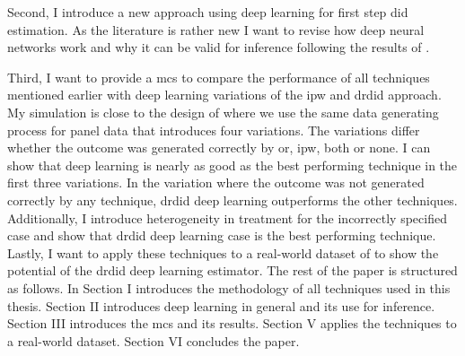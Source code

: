 Second, I introduce a new approach using deep learning for first step \ac{did} estimation.
As the literature is rather new I want to revise how deep neural networks work and why it can be valid for inference following the results of \citet{farrellDeepNeuralNetworks2021}.

Third, I want to provide a \ac{mcs} to compare the performance of all techniques mentioned earlier with deep learning variations of the \ac{ipw} and \ac{drdid} approach.
My simulation is close to the design of \citet{santannaDoublyRobustDifferenceindifferences2020} where we use the same data generating process for panel data that introduces four variations.
The variations differ whether the outcome was generated correctly by \ac{or}, \ac{ipw}, both or none.
I can show that deep learning is nearly as good as the best performing technique in the first three variations.
In the variation where the outcome was not generated correctly by any technique, \ac{drdid} deep learning outperforms the other techniques.
Additionally, I introduce heterogeneity in treatment for the incorrectly specified case and show that \ac{drdid} deep learning case is the best performing technique.
Lastly, I want to apply these techniques to a real-world dataset of \citet{favaraCreditSupplyPrice2015} to show the potential of the \ac{drdid} deep learning estimator. %
The rest of the paper is structured as follows. In Section I introduces the methodology of all techniques used in this thesis.
Section II introduces deep learning in general and its use for inference.
Section III introduces the \ac{mcs} and its results.
Section V applies the techniques to a real-world dataset.
Section VI concludes the paper.

